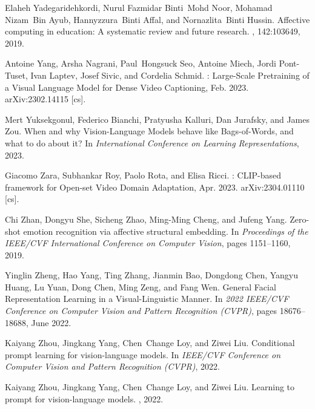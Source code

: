 \documentclass[10pt,twocolumn,letterpaper]{article}
\begin{document}
{\begin{thebibliography}{10}
Elaheh Yadegaridehkordi, Nurul Fazmidar Binti~Mohd Noor, Mohamad Nizam~Bin
  Ayub, Hannyzzura~Binti Affal, and Nornazlita~Binti Hussin.
\newblock Affective computing in education: A systematic review and future
  research.
, 142:103649, 2019.

Antoine Yang, Arsha Nagrani, Paul~Hongsuck Seo, Antoine Miech, Jordi
  Pont-Tuset, Ivan Laptev, Josef Sivic, and Cordelia Schmid.
: {Large}-{Scale} {Pretraining} of a {Visual} {Language}
  {Model} for {Dense} {Video} {Captioning}, Feb. 2023.
\newblock arXiv:2302.14115 [cs].

Mert Yuksekgonul, Federico Bianchi, Pratyusha Kalluri, Dan Jurafsky, and James
  Zou.
\newblock When and why {Vision}-{Language} {Models} behave like
  {Bags}-of-{Words}, and what to do about it?
\newblock In {\em International {Conference} on {Learning} {Representations}},
  2023.

Giacomo Zara, Subhankar Roy, Paolo Rota, and Elisa Ricci.
: {CLIP}-based framework for {Open}-set {Video} {Domain}
  {Adaptation}, Apr. 2023.
\newblock arXiv:2304.01110 [cs].

Chi Zhan, Dongyu She, Sicheng Zhao, Ming-Ming Cheng, and Jufeng Yang.
\newblock Zero-shot emotion recognition via affective structural embedding.
\newblock In {\em Proceedings of the IEEE/CVF International Conference on
  Computer Vision}, pages 1151--1160, 2019.

Yinglin Zheng, Hao Yang, Ting Zhang, Jianmin Bao, Dongdong Chen, Yangyu Huang,
  Lu Yuan, Dong Chen, Ming Zeng, and Fang Wen.
\newblock General {Facial} {Representation} {Learning} in a
  {Visual}-{Linguistic} {Manner}.
\newblock In {\em 2022 {IEEE}/{CVF} {Conference} on {Computer} {Vision} and
  {Pattern} {Recognition} ({CVPR})}, pages 18676--18688, June 2022.

Kaiyang Zhou, Jingkang Yang, Chen~Change Loy, and Ziwei Liu.
\newblock Conditional prompt learning for vision-language models.
\newblock In {\em IEEE/CVF Conference on Computer Vision and Pattern
  Recognition (CVPR)}, 2022.

Kaiyang Zhou, Jingkang Yang, Chen~Change Loy, and Ziwei Liu.
\newblock Learning to prompt for vision-language models.
, 2022.

\end{thebibliography}

}
\end{document}

